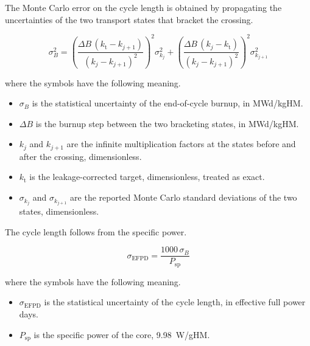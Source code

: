 The Monte Carlo error on the cycle length is obtained by propagating
the uncertainties of the two transport states that bracket the
crossing.

\begin{equation}
\sigma_B^2 = \left(\frac{\Delta B\,(k_\mathrm{t} - k_{j+1})}{(k_j - k_{j+1})^2}\right)^2 \sigma_{k_j}^2
+ \left(\frac{\Delta B\,(k_j - k_\mathrm{t})}{(k_j - k_{j+1})^2}\right)^2 \sigma_{k_{j+1}}^2
\label{eq:sigma-beoc}
\end{equation}

\noindent where the symbols have the following meaning.

\begin{itemize}
  \item $\sigma_B$ is the statistical uncertainty of the end-of-cycle
        burnup, in MWd/kgHM.

  \item $\Delta B$ is the burnup step between the two bracketing
        states, in MWd/kgHM.

  \item $k_j$ and $k_{j+1}$ are the infinite multiplication factors at
        the states before and after the crossing, dimensionless.

  \item $k_\mathrm{t}$ is the leakage-corrected target, dimensionless,
        treated as exact.

  \item $\sigma_{k_j}$ and $\sigma_{k_{j+1}}$ are the reported Monte
        Carlo standard deviations of the two states, dimensionless.
\end{itemize}

The cycle length follows from the specific power.

\begin{equation}
\sigma_\mathrm{EFPD} = \frac{1000\,\sigma_B}{P_\mathrm{sp}}
\label{eq:sigma-efpd}
\end{equation}

\noindent where the symbols have the following meaning.

\begin{itemize}
  \item $\sigma_\mathrm{EFPD}$ is the statistical uncertainty of the
        cycle length, in effective full power days.

  \item $P_\mathrm{sp}$ is the specific power of the core,
        \SI{9.98}{W/gHM}.
\end{itemize}

